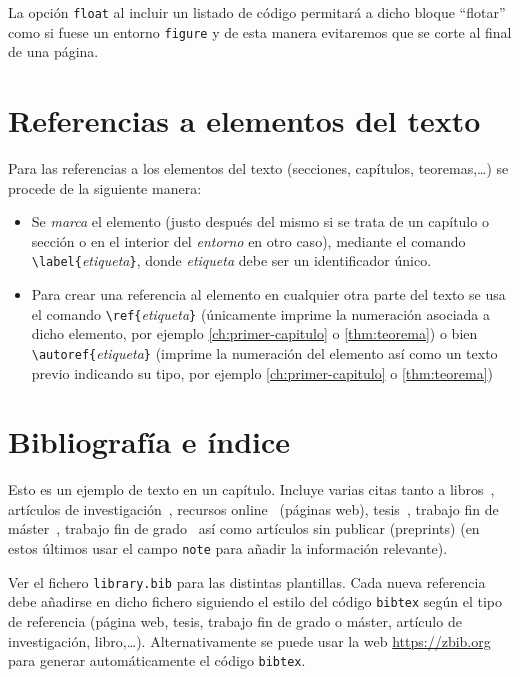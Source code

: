La opción \texttt{float} al incluir un listado de código permitará a dicho bloque ``flotar'' como si fuese un entorno \texttt{figure} y de esta manera evitaremos que se corte al final de una página.


\section{Referencias a elementos del texto}\label{sec:referencias}

Para las referencias a los elementos del texto (secciones, capítulos, teoremas,\ldots) se procede de la siguiente manera:
\begin{itemize}
  \item Se \emph{marca} el elemento (justo después del mismo si se trata de un capítulo o sección o en el interior del \emph{entorno} en otro caso), mediante el comando \verb+\label{+\emph{etiqueta}\verb+}+, donde \emph{etiqueta} debe ser un identificador único.
  \item Para crear una referencia al elemento en cualquier otra parte del texto se usa el comando \verb+\ref{+\emph{etiqueta}\verb+}+ (únicamente imprime la numeración asociada a dicho elemento, por ejemplo \ref{ch:primer-capitulo} o \ref{thm:teorema}) o bien \verb+\autoref{+\emph{etiqueta}\verb+}+ (imprime la numeración del elemento así como un texto previo indicando su tipo, por ejemplo \autoref{ch:primer-capitulo} o \autoref{thm:teorema})
\end{itemize}





\section{Bibliografía e índice}

Esto es un ejemplo de texto en un capítulo. Incluye varias citas tanto a libros~\cite{Aigner2018}, artículos de investigación~\cite{Euler1985}, recursos online~\cite{EulerWiki} (páginas web), tesis~\cite{CitekeyPhdthesis}, trabajo fin de máster~\cite{CitekeyMastersthesis}, trabajo fin de grado~\cite{CiteKeyBachelorsthesis} así como artículos sin publicar (preprints) \cite{castroinfantes2022conjugate} (en estos últimos usar el campo \texttt{note} para añadir la información relevante). 

Ver el fichero \texttt{library.bib} para las distintas plantillas. Cada nueva referencia debe añadirse en dicho fichero siguiendo el estilo del código \texttt{bibtex} según el tipo de referencia (página web, tesis, trabajo fin de grado o máster, artículo de investigación, libro,\ldots). Alternativamente se puede usar la web \href{https://zbib.org}{https://zbib.org} para generar automáticamente el código \texttt{bibtex}.


\endinput
